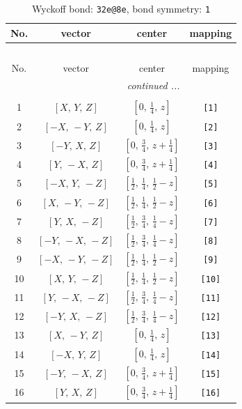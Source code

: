 \documentclass[fleqn,8pt]{jsarticle}
\begin{document}
\begin{longtable}{cccc}
\caption{Wyckoff bond: {\tt 32e@8e}, bond symmetry: {\tt 1}}
 \\
 \hline \hline
No. & vector & center & mapping \\ \hline \endfirsthead

\multicolumn{3}{l}{\tablename\ \thetable{}} \\
 \hline \hline
No. & vector & center & mapping \\ \hline \endhead

 \hline \hline
\multicolumn{3}{r}{\footnotesize\it continued ...} \\ \endfoot

 \hline \hline
\multicolumn{3}{r}{} \\ \endlastfoot

1 & $\left[ X,\, Y,\, Z \right]$ & $\left[ 0,\, \frac{1}{4},\, z \right]$ & {\tt [1]} \\ \hline
2 & $\left[ - X,\, - Y,\, Z \right]$ & $\left[ 0,\, \frac{1}{4},\, z \right]$ & {\tt [2]} \\ \hline
3 & $\left[ - Y,\, X,\, Z \right]$ & $\left[ 0,\, \frac{3}{4},\, z + \frac{1}{4} \right]$ & {\tt [3]} \\ \hline
4 & $\left[ Y,\, - X,\, Z \right]$ & $\left[ 0,\, \frac{3}{4},\, z + \frac{1}{4} \right]$ & {\tt [4]} \\ \hline
5 & $\left[ - X,\, Y,\, - Z \right]$ & $\left[ \frac{1}{2},\, \frac{1}{4},\, \frac{1}{2} - z \right]$ & {\tt [5]} \\ \hline
6 & $\left[ X,\, - Y,\, - Z \right]$ & $\left[ \frac{1}{2},\, \frac{1}{4},\, \frac{1}{2} - z \right]$ & {\tt [6]} \\ \hline
7 & $\left[ Y,\, X,\, - Z \right]$ & $\left[ \frac{1}{2},\, \frac{3}{4},\, \frac{1}{4} - z \right]$ & {\tt [7]} \\ \hline
8 & $\left[ - Y,\, - X,\, - Z \right]$ & $\left[ \frac{1}{2},\, \frac{3}{4},\, \frac{1}{4} - z \right]$ & {\tt [8]} \\ \hline
9 & $\left[ - X,\, - Y,\, - Z \right]$ & $\left[ \frac{1}{2},\, \frac{1}{4},\, \frac{1}{2} - z \right]$ & {\tt [9]} \\ \hline
10 & $\left[ X,\, Y,\, - Z \right]$ & $\left[ \frac{1}{2},\, \frac{1}{4},\, \frac{1}{2} - z \right]$ & {\tt [10]} \\ \hline
11 & $\left[ Y,\, - X,\, - Z \right]$ & $\left[ \frac{1}{2},\, \frac{3}{4},\, \frac{1}{4} - z \right]$ & {\tt [11]} \\ \hline
12 & $\left[ - Y,\, X,\, - Z \right]$ & $\left[ \frac{1}{2},\, \frac{3}{4},\, \frac{1}{4} - z \right]$ & {\tt [12]} \\ \hline
13 & $\left[ X,\, - Y,\, Z \right]$ & $\left[ 0,\, \frac{1}{4},\, z \right]$ & {\tt [13]} \\ \hline
14 & $\left[ - X,\, Y,\, Z \right]$ & $\left[ 0,\, \frac{1}{4},\, z \right]$ & {\tt [14]} \\ \hline
15 & $\left[ - Y,\, - X,\, Z \right]$ & $\left[ 0,\, \frac{3}{4},\, z + \frac{1}{4} \right]$ & {\tt [15]} \\ \hline
16 & $\left[ Y,\, X,\, Z \right]$ & $\left[ 0,\, \frac{3}{4},\, z + \frac{1}{4} \right]$ & {\tt [16]} \\
\end{longtable}
\end{document}

